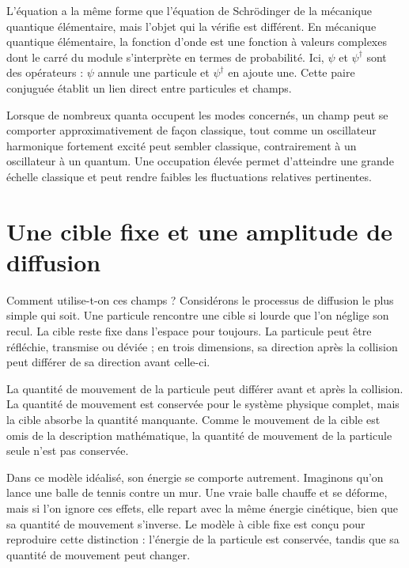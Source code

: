 L’équation a la même forme que l’équation de Schr\"odinger de la mécanique quantique élémentaire, mais l’objet qui la vérifie est différent. En mécanique quantique élémentaire, la fonction d’onde est une fonction à valeurs complexes dont le carré du module s’interprète en termes de probabilité. Ici, \(\psi\) et \(\psi^\dagger\) sont des opérateurs : \(\psi\) annule une particule et \(\psi^\dagger\) en ajoute une. Cette paire conjuguée établit un lien direct entre particules et champs.

Lorsque de nombreux quanta occupent les modes concernés, un champ peut se comporter approximativement de façon classique, tout comme un oscillateur harmonique fortement excité peut sembler classique, contrairement à un oscillateur à un quantum. Une occupation élevée permet d’atteindre une grande échelle classique et peut rendre faibles les fluctuations relatives pertinentes.


\section{Une cible fixe et une amplitude de diffusion}

Comment utilise-t-on ces champs ? Considérons le processus de diffusion le plus simple qui soit. Une particule rencontre une cible si lourde que l’on néglige son recul. La cible reste fixe dans l’espace pour toujours. La particule peut être réfléchie, transmise ou déviée ; en trois dimensions, sa direction après la collision peut différer de sa direction avant celle-ci.

La quantité de mouvement de la particule peut différer avant et après la collision. La quantité de mouvement est conservée pour le système physique complet, mais la cible absorbe la quantité manquante. Comme le mouvement de la cible est omis de la description mathématique, la quantité de mouvement de la particule seule n’est pas conservée.

Dans ce modèle idéalisé, son énergie se comporte autrement. Imaginons qu’on lance une balle de tennis contre un mur. Une vraie balle chauffe et se déforme, mais si l’on ignore ces effets, elle repart avec la même énergie cinétique, bien que sa quantité de mouvement s’inverse. Le modèle à cible fixe est conçu pour reproduire cette distinction : l’énergie de la particule est conservée, tandis que sa quantité de mouvement peut changer.

